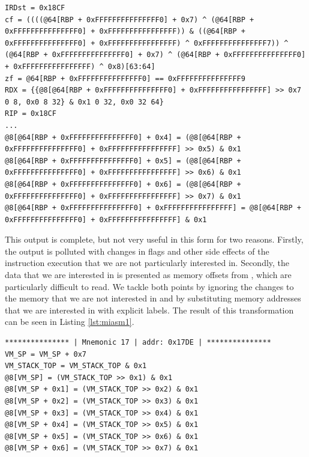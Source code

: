 \begin{lstlisting}[label={lst:miasm0}, caption={Partial result of symbolically executing a function handler in Miasm. We notice the state change in core registers such as \cc{RDX}, flag changes, as well as changes in memory. The output is clearly convoluted and not easy to read. }]
IRDst = 0x18CF
cf = ((((@64[RBP + 0xFFFFFFFFFFFFFFF0] + 0x7) ^ (@64[RBP + 0xFFFFFFFFFFFFFFF0] + 0xFFFFFFFFFFFFFFFF)) & ((@64[RBP + 0xFFFFFFFFFFFFFFF0] + 0xFFFFFFFFFFFFFFFF) ^ 0xFFFFFFFFFFFFFFF7)) ^ (@64[RBP + 0xFFFFFFFFFFFFFFF0] + 0x7) ^ (@64[RBP + 0xFFFFFFFFFFFFFFF0] + 0xFFFFFFFFFFFFFFFF) ^ 0x8)[63:64]
zf = @64[RBP + 0xFFFFFFFFFFFFFFF0] == 0xFFFFFFFFFFFFFFF9
RDX = {{@8[@64[RBP + 0xFFFFFFFFFFFFFFF0] + 0xFFFFFFFFFFFFFFFF] >> 0x7 0 8, 0x0 8 32} & 0x1 0 32, 0x0 32 64}
RIP = 0x18CF
...
@8[@64[RBP + 0xFFFFFFFFFFFFFFF0] + 0x4] = (@8[@64[RBP + 0xFFFFFFFFFFFFFFF0] + 0xFFFFFFFFFFFFFFFF] >> 0x5) & 0x1
@8[@64[RBP + 0xFFFFFFFFFFFFFFF0] + 0x5] = (@8[@64[RBP + 0xFFFFFFFFFFFFFFF0] + 0xFFFFFFFFFFFFFFFF] >> 0x6) & 0x1
@8[@64[RBP + 0xFFFFFFFFFFFFFFF0] + 0x6] = (@8[@64[RBP + 0xFFFFFFFFFFFFFFF0] + 0xFFFFFFFFFFFFFFFF] >> 0x7) & 0x1
@8[@64[RBP + 0xFFFFFFFFFFFFFFF0] + 0xFFFFFFFFFFFFFFFF] = @8[@64[RBP + 0xFFFFFFFFFFFFFFF0] + 0xFFFFFFFFFFFFFFFF] & 0x1
\end{lstlisting}

This output is complete, but not very useful in this form for two reasons. Firstly, the output is polluted with changes in flags and other side effects of the instruction execution that we are not particularly interested in. Secondly, the data that we are interested in is presented as memory offsets from , which are particularly difficult to read. We tackle both points by ignoring the changes to the memory that we are not interested in and by substituting memory addresses that we are interested in with explicit labels. The result of this transformation can be seen in Listing \ref{lst:miasm1}.

\begin{lstlisting}[label={lst:miasm1}, caption={A cleaned-up result of symbolically executing the same function handler as in Listing \ref{lst:miasm0}. We only chose to display the change in relevant registers and memory locations. Additionally, we introduced labels for better clarity.}]
*************** | Mnemonic 17 | addr: 0x17DE | ***************
VM_SP = VM_SP + 0x7
VM_STACK_TOP = VM_STACK_TOP & 0x1
@8[VM_SP] = (VM_STACK_TOP >> 0x1) & 0x1
@8[VM_SP + 0x1] = (VM_STACK_TOP >> 0x2) & 0x1
@8[VM_SP + 0x2] = (VM_STACK_TOP >> 0x3) & 0x1
@8[VM_SP + 0x3] = (VM_STACK_TOP >> 0x4) & 0x1
@8[VM_SP + 0x4] = (VM_STACK_TOP >> 0x5) & 0x1
@8[VM_SP + 0x5] = (VM_STACK_TOP >> 0x6) & 0x1
@8[VM_SP + 0x6] = (VM_STACK_TOP >> 0x7) & 0x1
\end{lstlisting}

